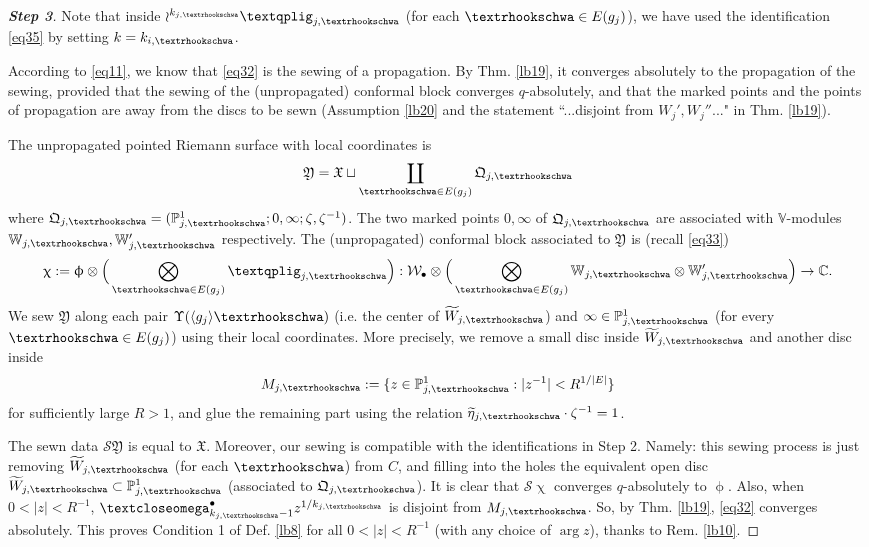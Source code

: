 \documentclass[12pt,a4paper,notitlepage]{article}
\theoremstyle{definition}
\theoremstyle{plain}
\newcommand{\fk}{\mathfrak}
\newcommand{\mc}{\mathcal}
\newcommand{\wtd}{\widetilde}
\newcommand{\bk}[1]{\langle {#1}\rangle}
\newcommand{\scr}{\mathscr}
\newcommand{\blt}{\bullet}
\newcommand{\Vbb}{\mathbb V}
\newcommand{\Wbb}{\mathbb W}
\newcommand{\Cbb}{\mathbb C}
\newcommand{\Pbb}{\mathbb P}
\newcommand{\tipaomega}{\text{\textcloseomega}}
\newcommand{\tipae}{\text{\textrhookschwa}}
\newcommand{\tipxphi}{\text{\textqplig}}
\numberwithin{equation}{subsection}
\begin{document}
\begin{proof}[\textbf{Step 3}]
Note that inside $\wr^{{k_{j,\tipae}}}\tipxphi_{j,\tipae}$ (for each $\tipae\in E(g_j)$), we have used the identification \eqref{eq35} by setting $k=k_{i,\tipae}$. 

According to \eqref{eq11}, we know that \eqref{eq32} is the sewing of a propagation. By Thm. \ref{lb19}, it converges absolutely to the propagation of the sewing, provided that the sewing of the (unpropagated) conformal block converges $q$-absolutely, and that the marked points and the points of propagation are away from the discs to be sewn (Assumption \ref{lb20} and the statement ``...disjoint from $W_j',W_j''$..." in Thm. \ref{lb19}). 

The unpropagated pointed Riemann surface with local coordinates is 
\begin{align*}
\fk Y=\fk X\sqcup\coprod_{\tipae\in E(g_j)}\fk Q_{j,\tipae}	
\end{align*}
where $\fk Q_{j,\tipae}=(\Pbb^1_{j,\tipae};0,\infty;\zeta,\zeta^{-1})$. The two marked points $0,\infty$ of $\fk Q_{j,\tipae}$ are associated with $\Vbb$-modules $\Wbb_{j,\tipae},\Wbb_{j,\tipae}'$ respectively. The (unpropagated) conformal block associated to $\fk Y$ is (recall \eqref{eq33})
\begin{align*}
\upchi:=\upphi\otimes \Big(\bigotimes_{\tipae\in E(g_j)}\tipxphi_{j,\tipae}\Big):\mc W_\blt\otimes	\Big(\bigotimes_{\tipae\in E(g_j)}\Wbb_{j,\tipae}\otimes\Wbb_{j,\tipae}'\Big)\rightarrow\Cbb.
\end{align*}
We sew $\fk Y$ along each pair $\Upsilon(\bk{g_j}\tipae)$ (i.e. the center of $\wtd W_{j,\tipae}$) and $\infty\in\Pbb^1_{j,\tipae}$  (for every $\tipae\in E(g_j)$) using their local coordinates. More precisely, we remove a small disc inside $\wtd W_{j,\tipae}$ and another disc inside
\begin{align*}
M_{j,\tipae}:=\{z\in\Pbb^1_{j,\tipae}:|z^{-1}|<R^{1/|E|}\}
\end{align*}
for sufficiently large $R>1$, and glue the remaining part using the relation $\wtd\eta_{j,\tipae}\cdot \zeta^{-1}=1$. 

The sewn data  $\scr S\fk Y$ is equal to $\fk X$.   Moreover, our sewing is compatible with the identifications in Step 2. Namely: this sewing process is just removing $\wtd W_{j,\tipae}$ (for each $\tipae$) from $C$, and filling into the holes  the equivalent open disc $\wtd W_{j,\tipae}\subset\Pbb^1_{j,\tipae}$ (associated to $\fk Q_{j,\tipae}$). It is clear that $\scr S\upchi$ converges $q$-absolutely to $\upphi$. Also, when $0<|z|<R^{-1}$, $\tipaomega_{k_{j,\tipae}-1}^\blt z^{1/{k_{j,\tipae}}}$ is disjoint from $M_{j,\tipae}$. So, by Thm. \ref{lb19}, \eqref{eq32} converges absolutely. This proves Condition 1 of Def. \ref{lb8} for all $0<|z|<R^{-1}$ (with any choice of $\arg z$), thanks to Rem. \ref{lb10}.
\end{proof}
\end{document}
